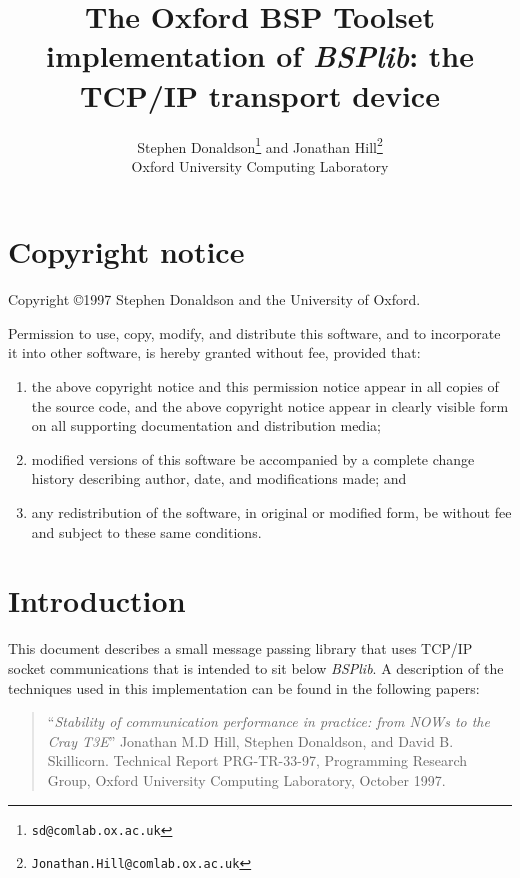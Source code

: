 \documentclass[12pt]{report}
\newcommand{\bsplib}{\textsl{BSPlib}}
\begin{document}
\title{The Oxford BSP Toolset implementation of \bsplib{}: the TCP/IP
transport device}
\author{Stephen Donaldson\footnote{\texttt{sd@comlab.ox.ac.uk}} and Jonathan Hill\footnote{\texttt{Jonathan.Hill@comlab.ox.ac.uk}}\\
        Oxford University Computing Laboratory}
\maketitle

\tableofcontents

\chapter*{Copyright notice}
\centerline{Copyright \copyright 1997 Stephen Donaldson and the University of Oxford.}
\vspace{2ex}

\noindent Permission to use, copy, modify, and distribute this
software, and to incorporate it into other software, is hereby granted
without fee, provided that:
\begin{enumerate}
\item the above copyright notice and this permission notice appear in
all copies of the source code, and the above copyright notice appear
in clearly visible form on all supporting documentation and
distribution media;

\item modified versions of this software be accompanied by a complete
change history describing author, date, and modifications made; and 

\item any redistribution of the software, in original or modified form, be without fee and subject to these same conditions.
\end{enumerate}

\chapter*{Introduction}
This document describes a small message passing library that uses
TCP/IP socket communications that is intended to sit below
\bsplib{}. A description of the techniques used in this implementation
can be found in the following papers:

\begin{quote}
\cite{hill:stability} ``\emph{Stability of communication performance in
     practice: from NOWs to the Cray T3E}'' Jonathan M.D Hill, Stephen
     Donaldson, and David B. Skillicorn. Technical Report
     PRG-TR-33-97, Programming Research Group, Oxford University
     Computing Laboratory, October 1997.
\end{quote}
\end{document}
